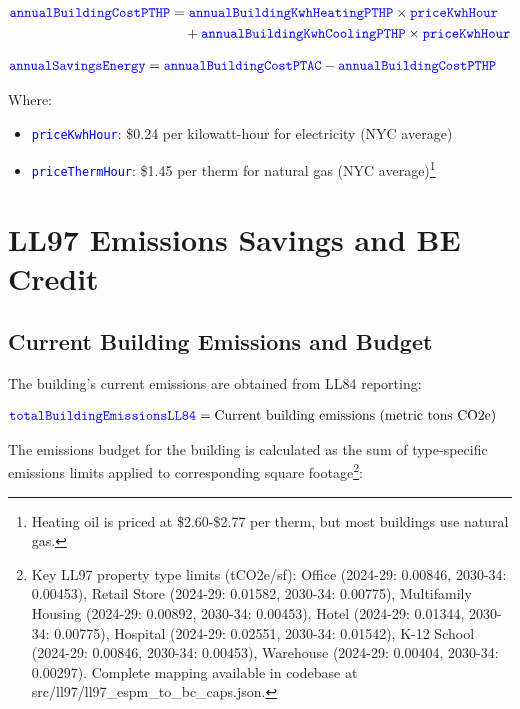 \documentclass{article}
\newcommand{\code}[1]{\textcolor{blue}{\texttt{#1}}}
\begin{document}
\begin{align}
\code{annualBuildingCostPTHP} &= \code{annualBuildingKwhHeatingPTHP} \times \code{priceKwhHour} \nonumber \\
&\quad + \code{annualBuildingKwhCoolingPTHP} \times \code{priceKwhHour}
\end{align}

\begin{align}
\code{annualSavingsEnergy} &= \code{annualBuildingCostPTAC} - \code{annualBuildingCostPTHP}
\end{align}

Where:
\begin{itemize}
    \item \code{priceKwhHour}: \$0.24 per kilowatt-hour for electricity (NYC average)
    \item \code{priceThermHour}: \$1.45 per therm for natural gas (NYC average)\footnote{Heating oil is priced at \$2.60-\$2.77 per therm, but most buildings use natural gas.}
\end{itemize}

\section{LL97 Emissions Savings and BE Credit}

\subsection{Current Building Emissions and Budget}

The building's current emissions are obtained from LL84 reporting:

\begin{align}
\code{totalBuildingEmissionsLL84} &= \text{Current building emissions (metric tons CO2e)}
\end{align}

The emissions budget for the building is calculated as the sum of type-specific emissions limits applied to corresponding square footage\footnote{Key LL97 property type limits (tCO2e/sf): Office (2024-29: 0.00846, 2030-34: 0.00453), Retail Store (2024-29: 0.01582, 2030-34: 0.00775), Multifamily Housing (2024-29: 0.00892, 2030-34: 0.00453), Hotel (2024-29: 0.01344, 2030-34: 0.00775), Hospital (2024-29: 0.02551, 2030-34: 0.01542), K-12 School (2024-29: 0.00846, 2030-34: 0.00453), Warehouse (2024-29: 0.00404, 2030-34: 0.00297). Complete mapping available in codebase at src/ll97/ll97\_espm\_to\_bc\_caps.json.}:
\end{document}
